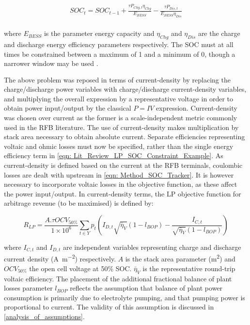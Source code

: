 \documentclass[preprint,3p,review,authoryear,10pt]{elsarticle}
\begin{document}
\begin{equation}
\label{eqn: Lit_Review_LP_SOC_Constraint_Example}
\begin{gathered}
SOC_t = SOC_{t-1} + \frac{\tau P_{Chg,t} \eta_{Chg}}{E_{BESS}} - \frac{\tau P_{Dis,t}}{E_{BESS}\eta_{Dis}} \\
\end{gathered}
\end{equation}

where $E_{BESS}$ is the parameter energy capacity and $\eta_{Chg}$ and $\eta_{Dis}$ are the charge and discharge energy efficiency parameters respectively. The SOC must at all times be constrained between a maximum of 1 and a minimum of 0, though a narrower window may be used \cite{Vaca2017}.

The above problem was reposed in terms of current-density by replacing the charge/discharge power variables with charge/discharge current-density variables, and multiplying the overall expression by a representative voltage in order to obtain power input/output by the classical $P = IV$ expression. Current-density was chosen over current as the former is a scale-independent metric commonly used in the RFB literature. The use of current-density makes multiplication by stack area necessary to obtain absolute current. Separate efficiencies representing voltaic and ohmic losses must now be specified, rather than the single energy efficiency term in \cref{eqn: Lit_Review_LP_SOC_Constraint_Example}. As current-density is defined based on the current at the RFB terminals, coulombic losses are dealt with upstream in \cref{eqn: Method_SOC_Tracker}. It is however necessary to incorporate voltaic losses in the objective function, as these affect the power input/output.  In current-density terms, the LP objective function for arbitrage revenue (to be maximised) is defined by:


\begin{equation}
\label{eqn: Linear_Schedule_Objective_Function_Current_as_Variable}
R_{LP} = \frac{A.\tau OCV_{50\%}}{1\times 10^{6}}\sum_{t \in Y}p_{t}(I_{D, t}\sqrt{\bar\eta_{V}}(1 - l_{BOP}) - \frac{I_{C,t}}{\sqrt{\bar\eta_{V}}(1 - l_{BOP})})
\end{equation}

where $I_{C,t}$ and $I_{D,t}$ are independent variables representing charge and discharge current density (\si{\ampere\per\square\meter}) respectively. $A$ is the stack area parameter (\si{\square\meter}) and $OCV_{50\%}$ the open cell voltage at 50\% SOC. $\bar\eta_{V}$ is the representative round-trip voltaic efficiency. The  placement of the additional fractional balance of plant losses parameter $l_{BOP}$ reflects the assumption that balance of plant power consumption is primarily due to electrolyte pumping, and that pumping power is proportional to current. The validity of this assumption is discussed in \cref{analysis_of_assumptions}. 
\end{document}
